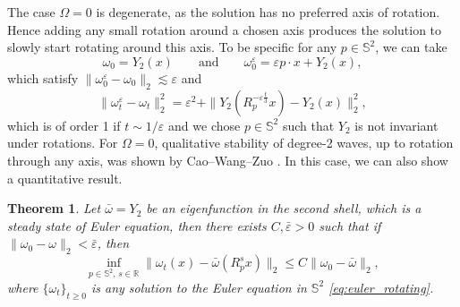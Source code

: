 \documentclass{amsart}
\newtheorem{theorem}{Theorem}[lemma]
\newtheorem{theorem}[lemma]{Theorem}  %
\def\R{{\mathbb{R}}}
\def\esse{{\mathbb{S}}}
\def\eps{{\varepsilon}}
\begin{document}
The case $\Omega=0$ is degenerate, as the solution has no preferred axis of rotation. Hence adding any small rotation around a chosen axis produces the solution to slowly start rotating around this axis. To be specific for any $p\in\esse^2$, we can take
$$
\omega_0=Y_2(x)\qquad\mbox{and}\qquad\omega_0^\eps=\eps p\cdot x+Y_2(x),
$$
which satisfy $\|\omega_0^\eps-\omega_0\|_2\lesssim\eps$ and
\begin{equation}\label{eq:degeneracy_case}
\|\omega_t^\eps-\omega_t\|_2^2= \eps^2 + \|Y_2(R_p^{-\eps\frac{t}{3}
}x)-Y_2(x)\|_2^2,    
\end{equation}
which is of order 1 if $t\sim 1/\eps$ and we chose $p\in\esse^2$ such that $Y_2$ is not invariant under rotations. For $\Omega= 0$, qualitative stability of degree-2 waves, up to rotation through any axis, was shown by Cao--Wang--Zuo \cite{cao2023stabilitydegree2rossbyhaurwitzwaves}. In this case, we can also show a quantitative result. 
\begin{theorem}\label{thm:2}
Let $\bar{\omega}=Y_2$ be an eigenfunction in the second shell, which is a steady state of Euler equation, then there exists $C, \bar\eps>0$ such that if $\|\omega_0-\omega\|_2<\bar\eps$, then
\begin{equation}\label{eq:3rdstability}
    \inf_{p\in\esse^2,\,s\in\R }\|\omega_t(x)-\bar{\omega}(R^s_p x)\|_2\leq C  \|\omega_0-\bar{\omega}\|_2,
\end{equation}
where $\{\omega_t\}_{t\ge 0}$ is any solution to the Euler equation in $\esse^2$ \eqref{eq:euler_rotating}.
\end{theorem}
\end{document}
